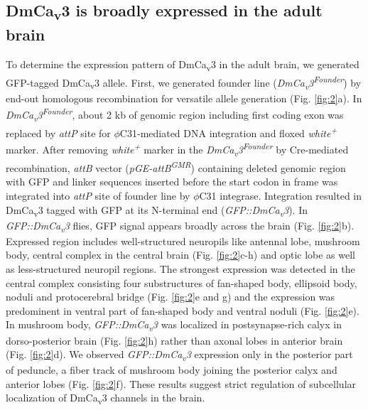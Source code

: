 \subsection*{DmCa\textsubscript{v}3 is broadly expressed in the adult brain}

To determine the expression pattern of DmCa\textsubscript{v}3 in the adult brain, we generated GFP-tagged DmCa\textsubscript{v}3 allele.
First, we generated founder line (\emph{DmCa\textsubscript{v}3\textsuperscript{Founder}})  by end-out homologous recombination for versatile allele generation\cite{Huang:2009ei} (Fig. \ref{fig:2}a).
 In \emph{DmCa\textsubscript{v}3\textsuperscript{Founder}}, about 2 kb of genomic  region including first coding exon was replaced by \emph{attP} site for  $\phi$C31-mediated DNA integration  and floxed \emph{white\textsuperscript{+}} marker. 
After removing \emph{white\textsuperscript{+}} marker in the \emph{DmCa\textsubscript{v}3\textsuperscript{Founder}} by Cre-mediated recombination, \emph{attB} vector (\emph{pGE-attB\textsuperscript{GMR}}) containing deleted genomic region with GFP and linker sequences inserted before the start codon in frame  was integrated into \emph{attP} site of founder line by $\phi$C31 integrase. 
Integration resulted in DmCa\textsubscript{v}3 tagged with GFP at its N-terminal end (\emph{GFP::DmCa\textsubscript{v}3}). 
In \emph{GFP::DmCa\textsubscript{v}3} flies, GFP signal appears broadly across the brain (Fig. \ref{fig:2}b).
Expressed region includes well-structured neuropils like antennal lobe, mushroom body, central complex in the central brain (Fig. \ref{fig:2}c-h) and optic lobe as well as less-structured neuropil regions.
The strongest expression was detected in the central complex consisting four substructures of fan-shaped body, ellipsoid body, noduli and protocerebral bridge (Fig. \ref{fig:2}e and g) and the expression was predominent in ventral part of fan-shaped body and ventral noduli (Fig. \ref{fig:2}e). 
In mushroom body, \emph{GFP::DmCa\textsubscript{v}3} was localized in postsynapse-rich calyx in dorso-posterior brain (Fig. \ref{fig:2}h) rather than axonal lobes in anterior brain (Fig. \ref{fig:2}d).
We observed \emph{GFP::DmCa\textsubscript{v}3} expression only in the posterior part of peduncle, a fiber track of mushroom body joining the posterior calyx and anterior lobes (Fig. \ref{fig:2}f).
These results suggest strict regulation of subcellular localization of DmCa\textsubscript{v}3 channels in the brain.


